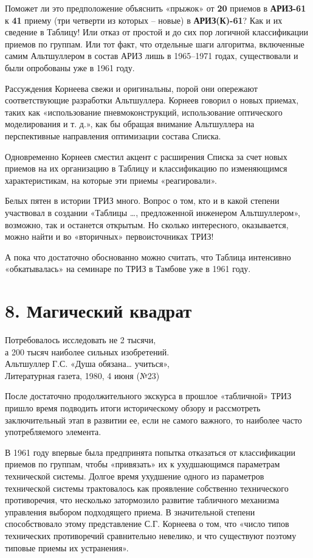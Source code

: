 \documentclass[11pt,a4paper]{article}
\begin{document}
Поможет ли это предположение объяснить «прыжок» от \textbf{20} приемов в
\textbf{АРИЗ-61} к \textbf{41} приему (три четверти из которых -- новые) в
\textbf{АРИЗ(К)-61}? Как и их сведение в Таблицу! Или отказ от простой и до
сих пор логичной классификации приемов по группам. Или тот факт, что отдельные
шаги алгоритма, включенные самим Альтшуллером в состав АРИЗ лишь в 1965--1971
годах, существовали и были опробованы уже в 1961 году.

Рассуждения Корнеева свежи и оригинальны, порой они опережают соответствующие
разработки Альтшуллера. Корнеев говорил о новых приемах, таких как
«использование пневмоконструкций, использование оптического моделирования и
т. д.», как бы обращая внимание Альтшуллера на перспективные направления
оптимизации состава Списка.

Одновременно Корнеев сместил акцент с расширения Списка за счет новых приемов
на их организацию в Таблицу и классификацию по изменяющимся характеристикам,
на которые эти приемы «реагировали».

Белых пятен в истории ТРИЗ много. Вопрос о том, кто и в какой степени
участвовал в создании «Таблицы …, предложенной инженером Альтшуллером»,
возможно, так и останется открытым. Но сколько интересного, оказывается, можно
найти и во «вторичных» первоисточниках ТРИЗ!

А пока что достаточно обоснованно можно считать, что Таблица интенсивно
«обкатывалась» на семинаре по ТРИЗ в Тамбове уже в 1961 году.
\clearpage

\section*{8. Магический квадрат}
\begin{flushleft}
  Потребовалось исследовать не 2 тысячи,\\
  а 200 тысяч наиболее сильных изобретений.\\
  Альтшуллер Г.С. «Душа обязана… учиться»,\\
  Литературная газета, 1980, 4 июня (№23)
\end{flushleft}
После достаточно продолжительного экскурса в прошлое «табличной» ТРИЗ пришло
время подводить итоги историческому обзору и рассмотреть заключительный этап в
развитии ее, если не самого важного, то наиболее часто употребляемого
элемента.

В 1961 году впервые была предпринята попытка отказаться от классификации
приемов по группам, чтобы «привязать» их к ухудшающимся параметрам технической
системы. Долгое время ухудшение одного из параметров технической системы
трактовалось как проявление собственно технического противоречия, что
несколько затормозило развитие табличного механизма управления выбором
подходящего приема. В значительной степени способствовало этому представление
С.Г. Корнеева о том, что «число типов технических противоречий сравнительно
невелико, и что существуют поэтому типовые приемы их устранения».
\cite{Korneev1964}
\end{document}
